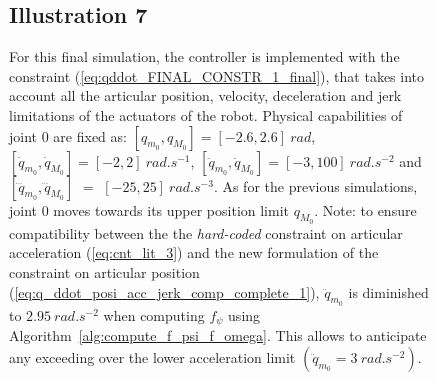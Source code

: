 \begin{figure}[!htbp]
\subsection{Illustration 7}
For this final simulation, the controller is implemented with the constraint (\ref{eq:qddot_FINAL_CONSTR_1_final}), that takes into account all the articular position, velocity, deceleration and jerk limitations of the actuators of the robot. Physical capabilities of joint $0$ are fixed as: \allowbreak$[q_{m_{0}}, q_{M_{0}}] = [-2.6, 2.6]~rad$, \allowbreak$[\dot{q}_{m_{0}}, \dot{q}_{M_{0}}] = [-2, 2]~rad.s^{-1}$, $[\ddot{q}_{m_{0}}, \ddot{q}_{M_{0}}] = [-3, 100]~rad.s^{-2}$ and \allowbreak$[\dddot{q}_{m_{0}}, \dddot{q}_{M_{0}}]$ $=$ $[-25, 25]~rad.s^{-3}$. As for the previous simulations, joint $0$ moves towards its upper position limit $q_{M_{0}}$. Note: to ensure compatibility between the  the \textit{hard-coded} constraint on articular acceleration (\ref{eq:cnt_lit_3}) and the new formulation of the constraint on articular position (\ref{eq:q_ddot_posi_acc_jerk_comp_complete_1}), $\ddot{q}_{m_{0}}$ is diminished to $2.95~rad.s^{-2}$ when computing $f_{\psi}$ using Algorithm~\ref{alg:compute_f_psi_f_omega}. This allows to anticipate any exceeding over the lower acceleration limit $(\ddot{q}_{m_{0}} = 3~rad.s^{-2})$.


\end{figure}
